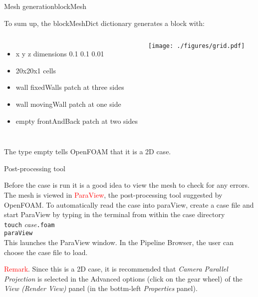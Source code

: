 \documentclass{beamer}
\begin{document}
\begin{frame}{Mesh generation}{blockMesh}


To sum up, the blockMeshDict dictionary generates a block with:

\begin{columns}[c]

\column{6.0cm} 

\begin{itemize}
\item x y z dimensions 0.1 0.1 0.01
\item 20x20x1 cells
\item wall fixedWalls patch at three sides
\item wall movingWall patch at one side
\item empty frontAndBack patch at two sides
\end{itemize}

\column{5.0cm} 
\begin{center}\texttt{[image: ./figures/grid.pdf]}\end{center}
\end{columns}



\begin{block}

{The type empty tells OpenFOAM that it is a 2D case.}
\end{block}

\end{frame}



\begin{frame}{Post-processing tool}

Before the case is run it is a good idea to view the mesh to check for any errors. The
mesh is viewed in \textcolor{red}{ParaView}, the post-processing tool suggested by OpenFOAM. To
automatically read the case into paraView, create a case file and start ParaView by typing in the terminal from within the case
directory\\[0.3cm]

\texttt{touch} \textit{case}\texttt{.foam} \\
\texttt{paraView}\\[0.3cm]

This launches the ParaView window. In the Pipeline Browser, the user
can choose the case file to load. 

\begin{block}

\textcolor{red}{Remark}. Since this is a 2D case, it is recommended that \emph{Camera Parallel Projection} is selected in the Advanced options (click on the gear wheel) of the \emph{View (Render View)} panel (in the bottm-left \emph{Properties} panel).
\end{block}
\end{frame}
\end{document}
